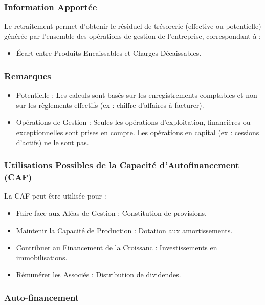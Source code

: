 \documentclass[a4paper, 12pt]{report}
\begin{document}
\subsubsection{Information Apportée}

Le retraitement permet d'obtenir le résiduel de trésorerie (effective ou potentielle) générée par l'ensemble des opérations de gestion de l'entreprise, correspondant à :

\begin{itemize}
	\item Écart entre Produits Encaissables et Charges Décaissables.
\end{itemize}

\subsubsection{Remarques}

\begin{itemize}
	\item Potentielle : Les calculs sont basés sur les enregistrements comptables et non sur les règlements effectifs (ex : chiffre d'affaires à facturer).
	\item Opérations de Gestion : Seules les opérations d'exploitation, financières ou exceptionnelles sont prises en compte. Les opérations en capital (ex : cessions d'actifs) ne le sont pas.
\end{itemize}

\subsubsection{Utilisations Possibles de la Capacité d'Autofinancement (CAF)}

La CAF peut être utilisée pour :

\begin{itemize}
	\item Faire face aux Aléas de Gestion : Constitution de provisions.
	\item Maintenir la Capacité de Production : Dotation aux amortissements.
	\item Contribuer au Financement de la Croissanc : Investissements en immobilisations.
	\item Rémunérer les Associés : Distribution de dividendes.
\end{itemize}

\subsubsection{Auto-financement}
\end{document}
